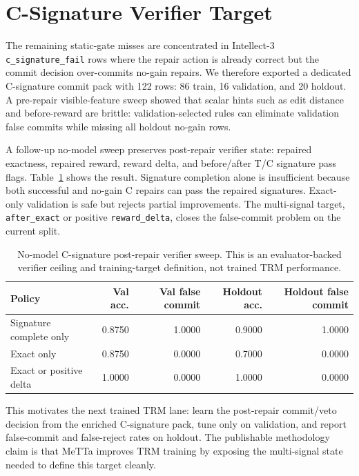 \documentclass[11pt]{article}
\begin{document}
\section{C-Signature Verifier Target}

The remaining static-gate misses are concentrated in Intellect-3 \texttt{c\_signature\_fail} rows where the repair action is already correct but the commit decision over-commits no-gain repairs. We therefore exported a dedicated C-signature commit pack with 122 rows: 86 train, 16 validation, and 20 holdout. A pre-repair visible-feature sweep showed that scalar hints such as edit distance and before-reward are brittle: validation-selected rules can eliminate validation false commits while missing all holdout no-gain rows.

A follow-up no-model sweep preserves post-repair verifier state: repaired exactness, repaired reward, reward delta, and before/after T/C signature pass flags. Table~\ref{tab:csig-verifier} shows the result. Signature completion alone is insufficient because both successful and no-gain C repairs can pass the repaired signatures. Exact-only validation is safe but rejects partial improvements. The multi-signal target, \texttt{after\_exact} or positive \texttt{reward\_delta}, closes the false-commit problem on the current split.

\begin{table}[t]
  \centering
  \small
  \begin{tabular}{lrrrr}
    \toprule
    Policy & Val acc. & Val false commit & Holdout acc. & Holdout false commit \\
    \midrule
    Signature complete only & 0.8750 & 1.0000 & 0.9000 & 1.0000 \\
    Exact only & 0.8750 & 0.0000 & 0.7000 & 0.0000 \\
    Exact or positive delta & 1.0000 & 0.0000 & 1.0000 & 0.0000 \\
    \bottomrule
  \end{tabular}
  \caption{No-model C-signature post-repair verifier sweep. This is an evaluator-backed verifier ceiling and training-target definition, not trained TRM performance.}
  \label{tab:csig-verifier}
\end{table}

This motivates the next trained TRM lane: learn the post-repair commit/veto decision from the enriched C-signature pack, tune only on validation, and report false-commit and false-reject rates on holdout. The publishable methodology claim is that MeTTa improves TRM training by exposing the multi-signal state needed to define this target cleanly.
\end{document}
